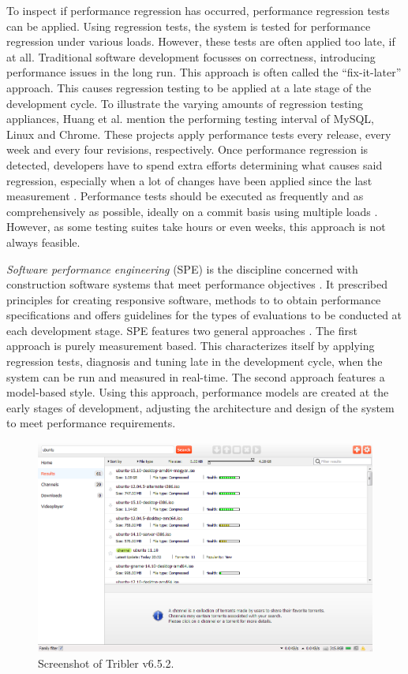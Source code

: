 To inspect if performance regression has occurred, performance regression tests can be applied.
Using regression tests, the system is tested for performance regression under various loads\cite{woodside2007future}.
However, these tests are often applied too late, if at all.
Traditional software development focusses on correctness, introducing performance issues in the long run.
This approach is often called the \enquote{fix-it-later} approach.
This causes regression testing to be applied at a late stage of the development cycle.
To illustrate the varying amounts of regression testing appliances, Huang et al. mention the performing testing interval of MySQL, Linux and Chrome.
These projects apply performance tests every release, every week and every four revisions, respectively.
Once performance regression is detected, developers have to spend extra efforts determining what causes said regression, especially when a lot of changes have been applied since the last measurement \cite{huang2014performance}.
Performance tests should be executed as frequently and as comprehensively as possible, ideally on a commit basis using multiple loads \cite{woodside2007future}.
However, as some testing suites take hours or even weeks, this approach is not always feasible.

\emph{Software performance engineering} (SPE) is the discipline concerned with construction software systems that meet performance objectives \cite{smith2003best}.
It prescribed principles for creating responsive software, methods to to obtain performance specifications and offers guidelines for the types of evaluations to be conducted at each development stage.
SPE features two general approaches \cite{woodside2007future}.
The first approach is purely measurement based.
This characterizes itself by applying regression tests, diagnosis and tuning late in the development cycle, when the system can be run and measured in real-time.
The second approach features a model-based style.
Using this approach, performance models are created at the early stages of development, adjusting the architecture and design of the system to meet performance requirements.

\begin{figure}[!h]
	\centering
	\includegraphics[width=\linewidth]{introduction/images/tribler_screenshot.png}
	\caption{Screenshot of Tribler v6.5.2.}
	\label{fig:tribler_screenshot}
\end{figure}

